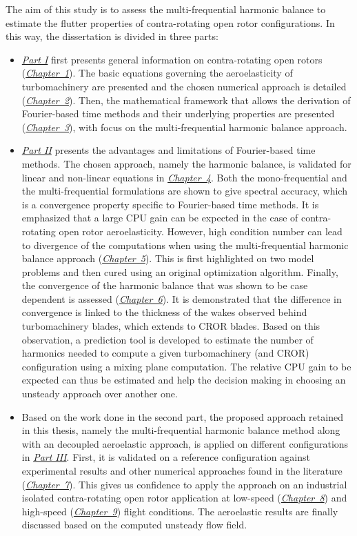 The aim of this study is to assess the
multi-frequential harmonic balance
to estimate the flutter properties of contra-rotating open rotor
configurations. In this way, the dissertation is divided in three parts:
\begin{itemize}
	\item \hyperref[part1]{\emph{Part I}} first presents general information on 
	contra-rotating open rotors (\hyperref[cha:cror]{\emph{Chapter~1}}).
	The basic equations governing the aeroelasticity of
	turbomachinery are presented and the chosen numerical approach 
	is detailed (\hyperref[cha:ael]{\emph{Chapter~2}}).
	Then, the mathematical framework that allows the derivation
	of Fourier-based time methods and their underlying properties
	are presented (\hyperref[cha:spectral_methods]{\emph{Chapter~3}}),
	with focus on the multi-frequential harmonic balance approach.
	\item \hyperref[part2]{\emph{Part II}} 
	presents the advantages and limitations
	of Fourier-based time methods. The chosen approach, namely
	the harmonic balance, is validated for linear and non-linear
	equations in \hyperref[cha:validation_hb]{\emph{Chapter~4}}. Both the
	mono-frequential and the multi-frequential formulations
	are shown to give spectral accuracy, which is a convergence
	property specific to Fourier-based time methods.
	It is emphasized
	that a large CPU gain can be expected in the
	case of contra-rotating open rotor aeroelasticity. 
	However, high condition number can lead to divergence
	of the computations when using the multi-frequential harmonic
	balance approach
	(\hyperref[cha:limitations_condition_number]{\emph{Chapter~5}}). This is 
	first highlighted on two model problems and then cured using
	an original optimization algorithm.
	Finally, the convergence of the harmonic balance 
	that was shown to be case dependent is
	assessed (\hyperref[cha:limitations_convergence]{\emph{Chapter~6}}). 
	It is demonstrated that the difference in convergence
	is linked to the thickness of the wakes observed behind
	turbomachinery blades, which extends to CROR blades. Based on this observation,
	a prediction tool is developed to estimate the
	number of harmonics needed to compute a given turbomachinery (and CROR)
	configuration using a mixing plane computation. 
	The relative CPU gain to be expected can thus be estimated
	and help the decision making in choosing an unsteady approach
	over another one.
	\item Based on the work done in the second part,
	the proposed approach retained in this thesis, 
	namely the multi-frequential harmonic balance method along with an 
	decoupled aeroelastic approach, is applied on different configurations
	in \hyperref[part3]{\emph{Part III}}. First, it is validated 
	on a reference configuration against experimental 
	results and other numerical approaches found in the literature
	(\hyperref[cha:stcf11]{\emph{Chapter~7}}). This gives us confidence
	to apply the approach on an industrial isolated contra-rotating
	open rotor application at low-speed (\hyperref[cha:dream_ls_isolated]{\emph{Chapter~8}})
	and high-speed (\hyperref[cha:dream_hs_isolated]{\emph{Chapter~9}})
	flight conditions. The aeroelastic results are finally discussed based
	on the computed unsteady flow field.
\end{itemize}
